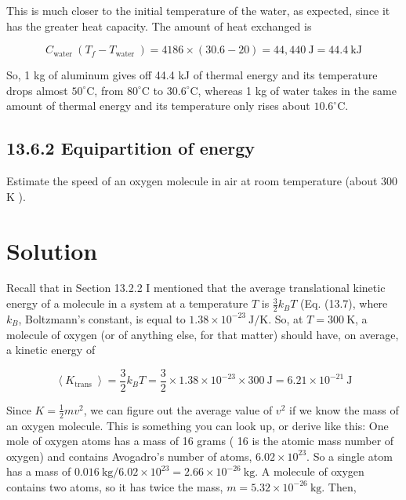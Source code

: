\documentclass[10pt]{article}
\begin{document}
This is much closer to the initial temperature of the water, as expected, since it has the greater heat capacity. The amount of heat exchanged is


\begin{equation*}
C_{\text {water }}\left(T_{f}-T_{\text {water }}\right)=4186 \times(30.6-20)=44,440 \mathrm{~J}=44.4 \mathrm{~kJ} \tag{13.23}
\end{equation*}


So, 1 kg of aluminum gives off 44.4 kJ of thermal energy and its temperature drops almost $50^{\circ} \mathrm{C}$, from $80^{\circ} \mathrm{C}$ to $30.6^{\circ} \mathrm{C}$, whereas 1 kg of water takes in the same amount of thermal energy and its temperature only rises about $10.6^{\circ} \mathrm{C}$.

\subsection*{13.6.2 Equipartition of energy}
Estimate the speed of an oxygen molecule in air at room temperature (about 300 K ).

\section*{Solution}
Recall that in Section 13.2.2 I mentioned that the average translational kinetic energy of a molecule in a system at a temperature $T$ is $\frac{3}{2} k_{B} T$ (Eq. (13.7), where $k_{B}$, Boltzmann's constant, is equal to $1.38 \times 10^{-23} \mathrm{~J} / \mathrm{K}$. So, at $T=300 \mathrm{~K}$, a molecule of oxygen (or of anything else, for that matter) should have, on average, a kinetic energy of


\begin{equation*}
\left\langle K_{\text {trans }}\right\rangle=\frac{3}{2} k_{B} T=\frac{3}{2} \times 1.38 \times 10^{-23} \times 300 \mathrm{~J}=6.21 \times 10^{-21} \mathrm{~J} \tag{13.24}
\end{equation*}


Since $K=\frac{1}{2} m v^{2}$, we can figure out the average value of $v^{2}$ if we know the mass of an oxygen molecule. This is something you can look up, or derive like this: One mole of oxygen atoms has a mass of 16 grams ( 16 is the atomic mass number of oxygen) and contains Avogadro's number of atoms, $6.02 \times 10^{23}$. So a single atom has a mass of $0.016 \mathrm{~kg} / 6.02 \times 10^{23}=2.66 \times 10^{-26} \mathrm{~kg}$. A molecule of oxygen contains two atoms, so it has twice the mass, $m=5.32 \times 10^{-26} \mathrm{~kg}$. Then,
\end{document}
